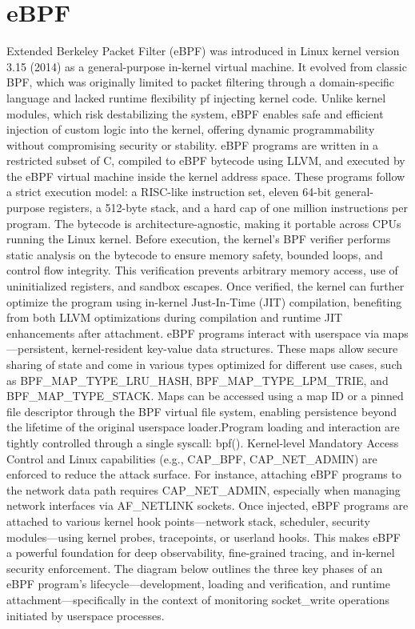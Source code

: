 \documentclass [11pt, proquest] {uwthesis}[2020/02/24]
\begin{document}
\section{eBPF}
Extended Berkeley Packet Filter (eBPF) was introduced in Linux kernel version 3.15 (2014) as a general-purpose in-kernel virtual machine. It evolved from classic BPF, which was originally limited to packet filtering through a domain-specific language and lacked runtime flexibility pf injecting kernel code. Unlike kernel modules, which risk destabilizing the system, eBPF enables safe and efficient injection of custom logic into the kernel, offering dynamic programmability without compromising security or stability. eBPF programs are written in a restricted subset of C, compiled to eBPF bytecode using LLVM, and executed by the eBPF virtual machine inside the kernel address space. These programs follow a strict execution model: a RISC-like instruction set, eleven 64-bit general-purpose registers, a 512-byte stack, and a hard cap of one million instructions per program. The bytecode is architecture-agnostic, making it portable across CPUs running the Linux kernel.
Before execution, the kernel’s BPF verifier performs static analysis on the bytecode to ensure memory safety, bounded loops, and control flow integrity. This verification prevents arbitrary memory access, use of uninitialized registers, and sandbox escapes. Once verified, the kernel can further optimize the program using in-kernel Just-In-Time (JIT) compilation, benefiting from both LLVM optimizations during compilation and runtime JIT enhancements after attachment. eBPF programs interact with userspace via maps—persistent, kernel-resident key-value data structures. These maps allow secure sharing of state and come in various types optimized for different use cases, such as BPF\_MAP\_TYPE\_LRU\_HASH, BPF\_MAP\_TYPE\_LPM\_TRIE, and BPF\_MAP\_TYPE\_STACK. Maps can be accessed using a map ID or a pinned file descriptor through the BPF virtual file system, enabling persistence beyond the lifetime of the original userspace loader.Program loading and interaction are tightly controlled through a single syscall: bpf(). Kernel-level Mandatory Access Control and Linux capabilities (e.g., CAP\_BPF, CAP\_NET\_ADMIN) are enforced to reduce the attack surface. For instance, attaching eBPF programs to the network data path requires CAP\_NET\_ADMIN, especially when managing network interfaces via AF\_NETLINK sockets. Once injected, eBPF programs are attached to various kernel hook points—network stack, scheduler, security modules—using kernel probes, tracepoints, or userland hooks. This makes eBPF a powerful foundation for deep observability, fine-grained tracing, and in-kernel security enforcement. The diagram below outlines the three key phases of an eBPF program’s lifecycle—development, loading and verification, and runtime attachment—specifically in the context of monitoring socket\_write operations initiated by userspace processes.
\end{document}
